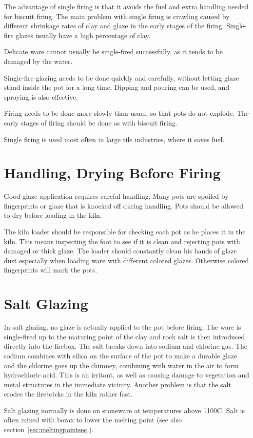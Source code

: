 The advantage of single firing is that it avoids the fuel and extra handling 
needed for biscuit firing. The main problem with single firing is crawling 
caused by different shrinkage rates of clay and glaze in the early stages of 
the firing. Single-fire glazes usually have a high percentage of clay.

Delicate ware cannot usually be single-fired successfully, as it tends to be 
damaged by the water.

Single-fire glazing needs to be done quickly and carefully, without letting 
glaze stand inside the pot for a long time. Dipping and pouring can be used, 
and spraying is also effective.

Firing needs to be done more slowly than usual, so that pots do not explode. 
The early stages of firing should be done as with biscuit firing.

Single firing is used most often in large tile industries, where it saves fuel.
\section{Handling, Drying Before Firing}
Good glaze application requires careful handling. Many pots are spoiled by 
fingerprints or glaze that is knocked off during handling. Pots should be 
allowed to dry before loading in the kiln.

The kiln loader should be responsible for checking each pot as he places it in 
the kiln. This means inspecting the foot to see if it is clean and rejecting 
pots with damaged or thick glaze. The loader should constantly clean his hands 
of glaze dust especially when loading ware with different colored glazes. 
Otherwise colored fingerprints will mark the pots.
\section{Salt Glazing}
In salt glazing, no glaze is actually applied to the pot before firing. The 
ware is single-fired up to the maturing point of the clay and rock salt is then 
introduced directly into the firebox. The salt breaks down into sodium and 
chlorine gas. The sodium combines with silica on the surface of the pot to make 
a durable glaze and the chlorine goes up the chimney, combining with water in 
the air to form hydrochloric acid. This is an irritant, as well as causing 
damage to vegetation and metal structures in the immediate vicinity. Another 
problem is that the salt erodes the firebricks in the kiln rather fast.

Salt glazing normally is done on stoneware at temperatures above 1100\degree C. 
Salt is often mixed with borax to lower the melting point (see also 
section~\ref{sec:meltingpointsec}).
